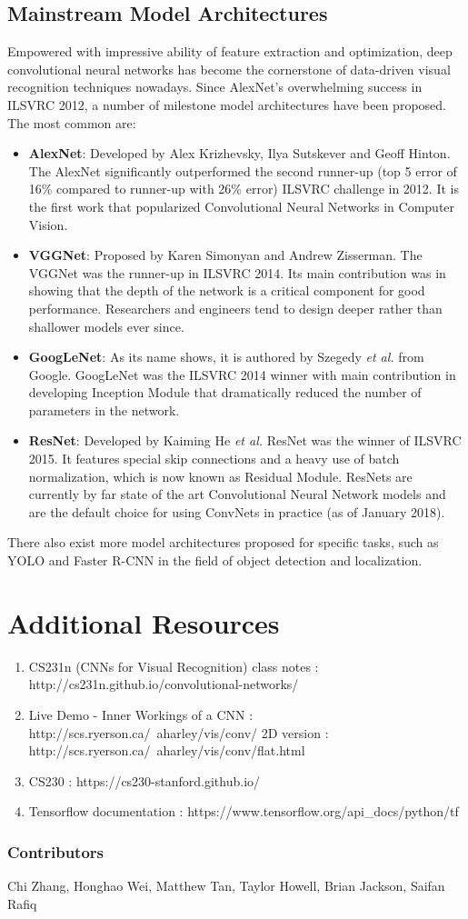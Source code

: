 \documentclass[twoside]{article}
\begin{document}
\subsection{Mainstream Model Architectures}
Empowered with impressive ability of feature extraction and optimization, deep convolutional neural networks has become the cornerstone of data-driven visual recognition techniques nowadays. Since AlexNet's overwhelming success in ILSVRC 2012, a number of milestone model architectures have been proposed. The most common are:
\begin{itemize}
\item \textbf{AlexNet}\cite{alexnet}: Developed by Alex Krizhevsky, Ilya Sutskever and Geoff Hinton. The AlexNet significantly outperformed the second runner-up (top 5 error of 16\% compared to runner-up with 26\% error) ILSVRC challenge in 2012. It is the first work that popularized Convolutional Neural Networks in Computer Vision.
\item \textbf{VGGNet}\cite{vggnet}: Proposed by Karen Simonyan and Andrew Zisserman. The VGGNet was the runner-up in ILSVRC 2014. Its main contribution was in showing that the depth of the network is a critical component for good performance. Researchers and engineers tend to design deeper rather than shallower models ever since.
\item \textbf{GoogLeNet}\cite{googlenet}: As its name shows, it is authored by Szegedy \textit{et al.} from Google. GoogLeNet was the ILSVRC 2014 winner with main contribution in developing Inception Module that dramatically reduced the number of parameters in the network.
\item \textbf{ResNet}\cite{resnet}:  Developed by Kaiming He \textit{et al.} ResNet was the winner of ILSVRC 2015. It features special skip connections and a heavy use of batch normalization, which is now known as Residual Module. ResNets are currently by far state of the art Convolutional Neural Network models and are the default choice for using ConvNets in practice (as of January 2018).
\end{itemize}

There also exist more model architectures proposed for specific tasks, such as YOLO\cite{yolo} and Faster R-CNN\cite{faster_rcnn} in the field of object detection and localization.

\section{Additional Resources}
\begin{enumerate}
    \item CS231n (CNNs for Visual Recognition) class notes : http://cs231n.github.io/convolutional-networks/
    \item Live Demo - Inner Workings of a CNN : http://scs.ryerson.ca/~aharley/vis/conv/
 2D version : http://scs.ryerson.ca/~aharley/vis/conv/flat.html
\item CS230 : https://cs230-stanford.github.io/
\item Tensorflow documentation : https://www.tensorflow.org/api_docs/python/tf
\end{enumerate}





\subsubsection*{Contributors}
Chi Zhang, Honghao Wei, Matthew Tan, Taylor Howell, Brian Jackson, Saifan Rafiq
\end{document}
